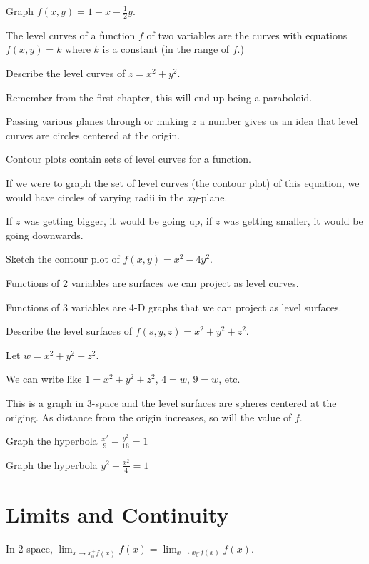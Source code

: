 \documentclass[../calc3.tex]{subfiles}
\begin{document}
\ex Graph $f(x,y)=1-x-\frac{1}{2}y$.

\begin{definition}
    The level curves of a function $f$ of two variables are the curves with equations $f(x,y)=k$ where $k$ is a constant (in the range of $f$.)    
\end{definition}

\pagebreak
\begin{example}
    Describe the level curves of $z=x^2+y^2$.

    Remember from the first chapter, this will end up being a paraboloid.

    Passing various planes through or making $z$ a number gives us an idea that level curves are circles centered at the origin.

    Contour plots contain sets of level curves for a function.

    If we were to graph the set of level curves (the contour plot) of this equation, we would have circles of varying radii in the $xy$-plane.

    If $z$ was getting bigger, it would be going up, if $z$ was getting smaller, it would be going downwards.
\end{example}

\ex Sketch the contour plot of $f(x,y)=x^2-4y^2$.

Functions of 2 variables are surfaces we can project as level curves.

Functions of 3 variables are 4-D graphs that we can project as level surfaces.

\begin{example}
    Describe the level surfaces of $f(s,y,z)=x^2+y^2+z^2$.

    Let $w=x^2+y^2+z^2$.

    We can write like $1=x^2+y^2+z^2$, $4=w$, $9=w$, etc.

    This is a graph in 3-space and the level surfaces are spheres centered at the origing. As distance from the origin increases, so will the value of $f$.
\end{example}

\ex Graph the hyperbola $\frac{x^2}{9}-\frac{y^2}{16}=1$

\ex Graph the hyperbola $y^2-\frac{x^2}{4}=1$

\section{Limits and Continuity}
In 2-space, $\lim_{x\to x_0^+ f(x)}f(x)=\lim_{x\to x_0^- f(x)}f(x)$.
\end{document}
